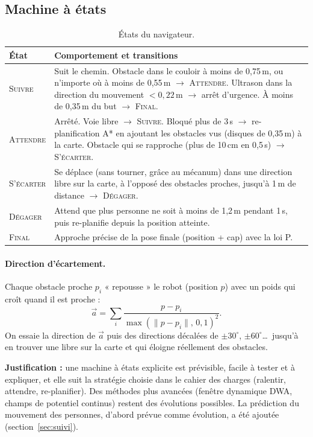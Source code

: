 \documentclass[11pt,a4paper]{article}
\begin{document}
\subsection{Machine à états}
\begin{table}[h]
\centering\small
\begin{tabularx}{\linewidth}{@{}lL@{}}
\toprule
\textbf{État} & \textbf{Comportement et transitions} \\
\midrule
\textsc{Suivre} & Suit le chemin. Obstacle dans le couloir à moins de 0,75\,m, ou n'importe
  où à moins de 0,55\,m $\rightarrow$ \textsc{Attendre}. Ultrason dans la direction du mouvement
  $< 0{,}22$\,m $\rightarrow$ arrêt d'urgence. À moins de 0,35\,m du but $\rightarrow$ \textsc{Final}. \\
\textsc{Attendre} & Arrêté. Voie libre $\rightarrow$ \textsc{Suivre}. Bloqué plus de 3\,s
  $\rightarrow$ re-planification A* en ajoutant les obstacles vus (disques de 0,35\,m) à la carte.
  Obstacle qui se rapproche (plus de 10\,cm en 0,5\,s) $\rightarrow$ \textsc{S'écarter}. \\
\textsc{S'écarter} & Se déplace (sans tourner, grâce au mécanum) dans une direction libre sur la
  carte, à l'opposé des obstacles proches, jusqu'à 1\,m de distance $\rightarrow$ \textsc{Dégager}. \\
\textsc{Dégager} & Attend que plus personne ne soit à moins de 1,2\,m pendant 1\,s, puis
  re-planifie depuis la position atteinte. \\
\textsc{Final} & Approche précise de la pose finale (position + cap) avec la loi P. \\
\bottomrule
\end{tabularx}
\caption{États du navigateur.}
\end{table}

\paragraph{Direction d'écartement.} Chaque obstacle proche $p_i$ « repousse » le robot (position
$p$) avec un poids qui croît quand il est proche :
\begin{equation}
\vec a = \sum_i \frac{p - p_i}{\max(\lVert p - p_i\rVert,\,0{,}1)^2}.
\end{equation}
On essaie la direction de $\vec a$ puis des directions décalées de $\pm30^\circ$, $\pm60^\circ$\dots\
jusqu'à en trouver une libre sur la carte et qui éloigne réellement des obstacles.

\textbf{Justification :} une machine à états explicite est prévisible, facile à tester et à
expliquer, et elle suit la stratégie choisie dans le cahier des charges (ralentir, attendre,
re-planifier). Des méthodes plus avancées (fenêtre dynamique DWA, champs de potentiel continus)
restent des évolutions possibles. La prédiction du mouvement des personnes, d'abord prévue comme
évolution, a été ajoutée (section~\ref{sec:suivi}).
\end{document}
